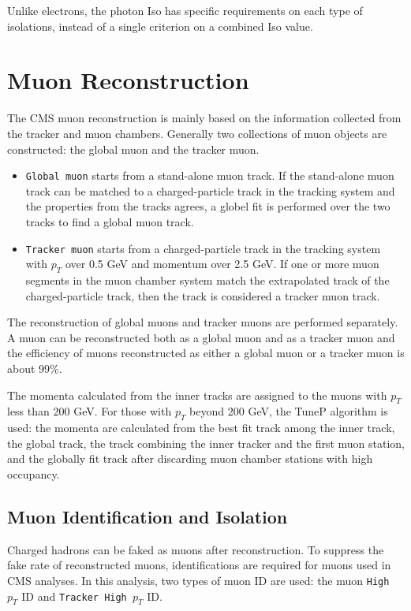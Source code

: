 \vspace{0.3cm}
Unlike electrons, the photon Iso has specific requirements on each type of isolations, instead of a single criterion on a combined Iso value.

\section{Muon Reconstruction}\label{sec:muonrecon}
The CMS muon reconstruction is mainly based on the information collected from the tracker and muon chambers. Generally two collections of muon objects are constructed: the global muon and the tracker muon.~\cite{ob_muonconst}
\begin{itemize}
\item \texttt{Global muon} starts from a stand-alone muon track. If the stand-alone muon track can be matched to a charged-particle track in the tracking system and the properties from the tracks agrees, a globel fit is performed over the two tracks to find a global muon track.
\item \texttt{Tracker muon} starts from a charged-particle track in the tracking system with $p_{T}$ over 0.5 GeV and momentum over 2.5 GeV. If one or more muon segments in the muon chamber system match the extrapolated track of the charged-particle track, then the track is considered a tracker muon track.
\end{itemize}

The reconstruction of global muons and tracker muons are performed separately. A muon can be reconstructed both as a global muon and as a tracker muon and the efficiency of muons reconstructed as either a global muon or a tracker muon is about 99\%.

\vspace{0.3cm}
The momenta calculated from the inner tracks are assigned to the muons with $p_{T}$ less than 200 GeV. For those with $p_T$ beyond 200 GeV, the TuneP algorithm is used: the momenta are calculated from the best fit track among the inner track, the global track, the track combining the inner tracker and the first muon station, and the globally fit track after discarding muon chamber stations with high occupancy. 

\subsection{Muon Identification and Isolation}\label{sec:ob_midiso}
Charged hadrons can be faked as muons after reconstruction. To suppress the fake rate of reconstructed muons, identifications are required for muons used in CMS analyses. In this analysis, two types of muon ID are used: the muon \texttt{High $p_T$} ID and \texttt{Tracker High $p_T$} ID. 

